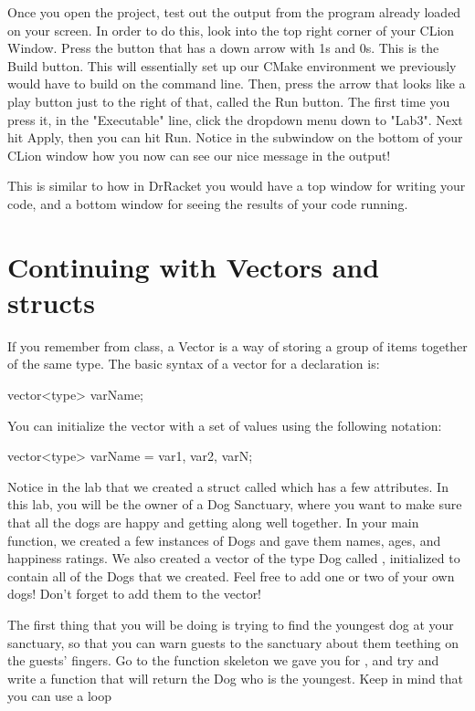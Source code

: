 \documentclass{tufte-handout}
\begin{document}
Once you open the project, test out the output from the program already loaded on your screen.  In order to do this, look into the top right corner of your CLion Window.  Press the button that has a down arrow with 1s and 0s.  This is the Build button.  This will essentially set up our CMake environment we previously would have to build on the command line.     Then, press the arrow that looks like a play button just to the right of that, called the Run button.  The first time you press it, in the "Executable" line, click the dropdown menu down to "Lab3".  Next hit Apply, then you can hit Run.  Notice in the subwindow on the bottom of your CLion window how you now can see our nice message in the output!  


This is similar to how in DrRacket you would have a top window for writing your code, and a bottom window for seeing the results of your code running.
\section{Continuing with Vectors and structs}
If you remember from class, a Vector is a way of storing a group of items together of the same type.  The basic syntax of a vector for a declaration is:
\begin{Code}
vector<type> varName;
\end{Code}

You can initialize the vector with a set of values using the following notation:
\begin{Code}
vector<type> varName = {var1, var2, varN};
\end{Code}

Notice in the lab that we created a struct called  which has a few attributes.  In this lab, you will be the owner of a Dog Sanctuary, where you want to make sure that all the dogs are happy and getting along well together.  In your main function, we created a few instances of Dogs and gave them names, ages, and happiness ratings.    We also created a vector of the type Dog called , initialized to contain all of the Dogs that we created.  Feel free to add one or two of your own dogs!  Don't forget to add them to the vector!

The first thing that you will be doing is trying to find the youngest dog at your sanctuary, so that you can warn guests to the sanctuary about them teething on the guests' fingers.    Go to the function skeleton we gave you for , and try and write a function that will return the Dog who is the youngest. Keep in mind that you can use a  loop 
\end{document}
